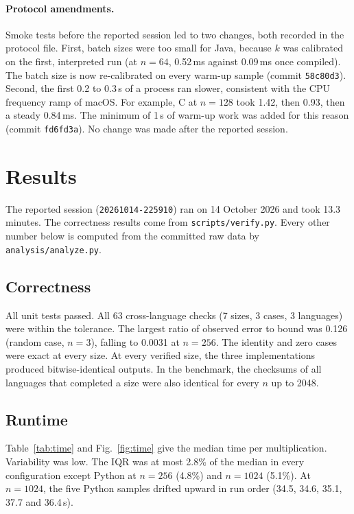\documentclass[11pt,a4paper]{article}
\newcommand{\session}{\texttt{20261014-225910}}
\begin{document}
\paragraph{Protocol amendments.} Smoke tests before the reported session led to
two changes, both recorded in the protocol file. First, batch sizes were too
small for Java, because $k$ was calibrated on the first, interpreted run (at
$n=64$, 0.52\,ms against 0.09\,ms once compiled). The batch size is now re-calibrated on every warm-up sample (commit
\texttt{58c80d3}). Second, the first 0.2 to 0.3\,s of a process ran slower,
consistent with the CPU frequency ramp of macOS. For example, C at $n=128$ took
1.42, then 0.93, then a steady 0.84\,ms. The minimum of 1\,s of warm-up work was
added for this reason (commit \texttt{fd6fd3a}). No change was made after the
reported session.

\section{Results}
\label{sec:results}

The reported session (\session) ran on 14 October 2026 and took 13.3 minutes.
The correctness results come from \texttt{scripts/verify.py}. Every other number
below is computed from the committed raw data by \texttt{analysis/analyze.py}.

\subsection{Correctness}

All unit tests passed. All 63 cross-language checks (7 sizes, 3 cases, 3
languages) were within the tolerance. The largest ratio of observed error to
bound was 0.126 (random case, $n=3$), falling to 0.0031 at $n=256$. The identity
and zero cases were exact at every size. At every verified size, the three
implementations produced bitwise-identical outputs. In the benchmark, the
checksums of all languages that completed a size were also identical for every
$n$ up to 2048.

\subsection{Runtime}

Table~\ref{tab:time} and Fig.~\ref{fig:time} give the median time per
multiplication. Variability was low. The IQR was at most 2.8\% of the median in
every configuration except Python at $n=256$ (4.8\%) and $n=1024$ (5.1\%). At
$n=1024$, the five Python samples drifted upward in run order (34.5, 34.6, 35.1,
37.7 and 36.4\,s).
\end{document}
